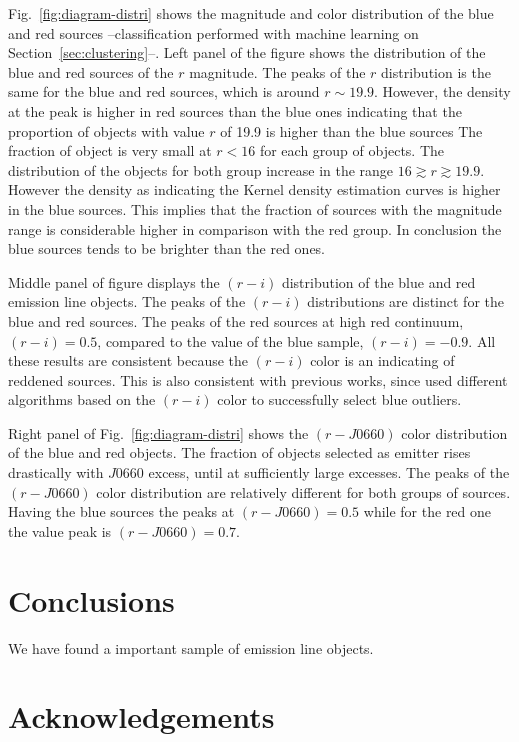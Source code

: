 \documentclass[fleqn,usenatbib]{mnras}
\begin{document}
Fig.~\ref{fig:diagram-distri} shows the magnitude and color distribution of the blue and red
sources --classification performed with machine learning on Section~\ref{sec:clustering}--.
Left panel of the figure shows the distribution of the blue and red sources of the $r$ magnitude.
The peaks of the $r$ distribution is the same for the blue and red sources, which is around
$r \sim 19.9$. However, the density at the peak is higher in red sources than the blue ones
indicating that the proportion of objects with value $r$ of 19.9 is higher than the blue sources
The fraction of object is very small at $r < 16$ for each group of objects.
The distribution of the objects for both group increase in the range $16 \gtrsim r \gtrsim 19.9$.
However the density as indicating the Kernel density estimation curves is higher in the
blue sources. This implies that the fraction of sources with the magnitude range is considerable
higher in comparison with the red group. In conclusion the blue sources tends to be brighter
than the red ones.


Middle panel of figure displays the $(r - i)$ distribution of the blue and red emission line
objects. The peaks of the $(r - i)$ distributions are distinct for the blue and red sources.
The peaks of the red sources at high red continuum,  $(r - i) = 0.5$, compared to the value
of the blue sample, $(r - i) = -0.9$. All these results are consistent because the $(r - i)$
color is an indicating of reddened sources. This is also consistent with previous works,
since \citet{Wevers:2017} used different algorithms based on the  $(r - i)$ color
to successfully select blue outliers.

Right panel of Fig.~\ref{fig:diagram-distri} shows the
$(r - J0660)$ color distribution of the blue and red objects.  The fraction of objects selected
as emitter rises drastically with $J$0660 excess, until at sufficiently large excesses. The peaks
of the $(r - J0660)$ color distribution are relatively different for both groups of sources.
Having the blue sources the peaks at  $(r - J0660) = 0.5$ while for the red one the value peak
is $(r - J0660)=0.7$.


\section{Conclusions}

We have found a important sample of emission line objects. 

\section*{Acknowledgements}
\end{document}
